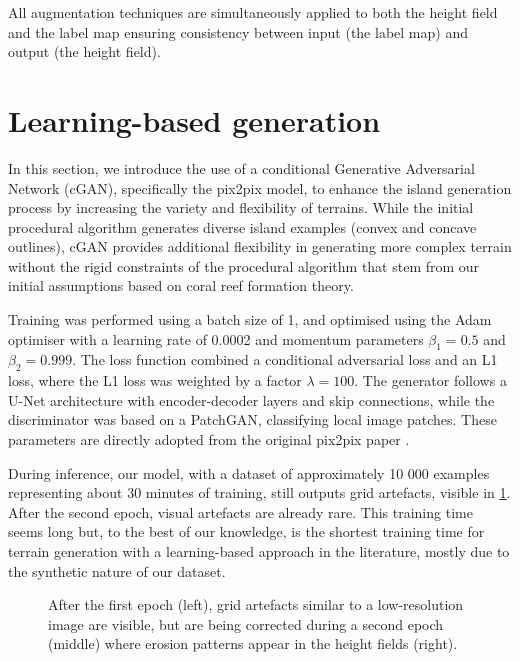 All augmentation techniques are simultaneously applied to both the height field and the label map ensuring consistency between input (the label map) and output (the height field).

\section{Learning-based generation}
\label{sec:coral-island-cGAN-training}

In this section, we introduce the use of a conditional Generative Adversarial Network (cGAN), specifically the pix2pix model, to enhance the island generation process by increasing the variety and flexibility of terrains. While the initial procedural algorithm generates diverse island examples (convex and concave outlines), cGAN provides additional flexibility in generating more complex terrain without the rigid constraints of the procedural algorithm that stem from our initial assumptions based on coral reef formation theory.

Training was performed using a batch size of 1, and optimised using the Adam optimiser with a learning rate of 0.0002 and momentum parameters $\beta_1 = 0.5$ and $\beta_2 = 0.999$. The loss function combined a conditional adversarial loss and an L1 loss, where the L1 loss was weighted by a factor $\lambda = 100$. The generator follows a U-Net architecture with encoder-decoder layers and skip connections, while the discriminator was based on a PatchGAN, classifying local image patches. These parameters are directly adopted from the original pix2pix paper \cite{Isola2017}.

During inference, our model, with a dataset of approximately 10 000 examples representing about 30 minutes of training, still outputs grid artefacts, visible in \cref{fig:coral-island-first-epoch}. After the second epoch, visual artefacts are already rare. This training time seems long but, to the best of our knowledge, is the shortest training time for terrain generation with a learning-based approach in the literature, mostly due to the synthetic nature of our dataset.

\begin{figure}[t]
    \caption{After the first epoch (left), grid artefacts similar to a low-resolution image are visible, but are being corrected during a second epoch (middle) where erosion patterns appear in the height fields (right).}
    \label{fig:coral-island-first-epoch}
\end{figure}

